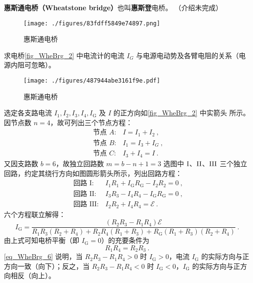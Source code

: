 

\textbf{惠斯通电桥（Wheatstone bridge）}也叫\textbf{惠斯登}电桥。 （介绍未完成）

\begin{figure}[ht]
\centering
\texttt{[image: ./figures/83fdff5849e74897.png]}
\caption{惠斯通电桥} \label{fig_WheBrg_1}
\end{figure}

求电桥\autoref{fig_WheBrg_2} 中电流计的电流 $I_G$ 与电源电动势及各臂电阻的关系（电源内阻可忽略）。
\begin{figure}[ht]
\centering
\texttt{[image: ./figures/487944abe3161f9e.pdf]}
\caption{惠斯通电桥} \label{fig_WheBrg_2}
\end{figure}

选定各支路电流 $I_{1}, I_{2}, I_{3}, I_{4}, I_{\mathrm{G}}$ 及 $I $ 的正方向如\autoref{fig_WheBrg_2} 中实箭头
所示。因节点数 $n = 4$，故可列出三个节点方程：
\begin{equation}
\begin{array}{ll}\text { 节点 } A: & I=I_{1}+I_{2}~, \\ \text { 节点 } B: & I_{1}=I_{3}+I_{G}~, \\ \text { 节点 } C: & I_{3}+I_{4}=I~.\end{array}
\end{equation}
又因支路数 $b=6$，故独立回路数 $m=b-n+1=3$ 选图中 $\rm I$、$\rm II$、$\rm III$ 三个独立回路，约定其绕行方向如图圆形箭头所示，列出回路方程：
\begin{equation}
\begin{array}{ll}\text { 回路 } \mathrm{I}: & I_{1} R_{1}+I_{\mathrm{G}} R_{\mathrm{G}}-I_{2} R_{2}=0~, \\ \text { 回路 } \mathrm{II}: & I_{3} R_{3}-I_{4} R_{4}-I_{\mathrm{G}} R_{\mathrm{G}}=0~, \\ \text { 回路 } \mathrm{III}  : & I_{2} R_{2}+I_{4} R_{4}=\mathscr{E}~.\end{array}
\end{equation}
六个方程联立解得：
\begin{equation} \label{eq_WheBrg_6}
I_{\mathrm{G}}=\frac{\left(R_{2} R_{3}-R_{1} R_{4}\right) \mathscr{E}}{{R}_{1} R_{3}\left(R_{2}+R_{4}\right)+R_{2} R_{4}\left(R_{1}+R_{3}\right)+R_{\mathrm{G}}\left(R_{1}+R_{3}\right)\left(R_{2}+R_{4}\right)}~.
\end{equation}
由上式可知电桥平衡（即 $I_\mathrm{G} = 0$）的充要条件为
\begin{equation}
R_{1} R_{4}=R_{2} R_{3}~.
\end{equation}
\autoref{eq_WheBrg_6} 说明，当 $R_{2} R_{3}-R_{1} R_{4}>0$ 时 $I_{\mathrm{G}}>0$，电流 $I_{\mathrm{G}}$ 的实际方向与正方向一致（向下）；反之，当 $R_{2} R_{3}-R_{1} R_{4}<0$ 时 $I_{\mathrm{G}}<0$，$I_{\mathrm{G}}$ 的实际方向与正方向相反（向上）。
